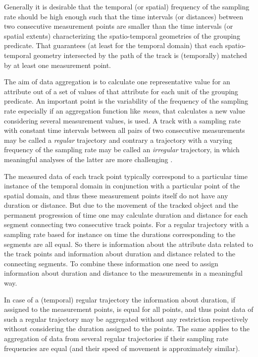 \documentclass[12pt, oneside, a4paper]{scrbook}
\begin{document}
Generally it is desirable that the temporal (or spatial) frequency of the sampling rate should be high enough such that the time intervals (or distances) between two consecutive measurement points are smaller than the time intervals (or spatial extents) characterizing the spatio-temporal geometries of the grouping predicate.
That guarantees (at least for the temporal domain) that each spatio-temporal geometry intersected by the path of the track is (temporally) matched by at least one measurement point.
\par\medskip
The aim of data aggregation is to calculate one representative value for an attribute out of a set of values of that attribute for each unit of the grouping predicate.
An important point is the variability of the frequency of the sampling rate especially if an aggregation function like \textit{mean}, that calculates a new value considering several measurement values, is used. 
A track with a sampling rate with constant time intervals between all pairs of two consecutive measurements may be called a \textit{regular} trajectory and contrary a trajectory with a varying frequency of the sampling rate may be called an \textit{irregular} trajectory, in which meaningful analyses of the latter are more challenging \citep{calenge_concept_2009}.
\par\medskip
The measured data of each track point typically correspond to a particular time instance of the temporal domain in conjunction with a particular point of the spatial domain, and thus these measurement points itself do not have any duration or distance. 
But due to the movement of the tracked object and the permanent progression of time one may calculate duration and distance for each segment connecting two consecutive track points. 
For a regular trajectory with a sampling rate based for instance on time the durations corresponding to the segments are all equal.
So there is information about the attribute data related to the track points and information about duration and distance related to the connecting segments.
To combine these information one need to assign information about duration and distance to the measurements in a meaningful way.
\par\medskip
In case of a (temporal) regular trajectory the information about duration, if assigned to the measurement points, is equal for all points, and thus point data of such a regular trajectory may be aggregated without any restriction respectively without considering the duration assigned to the points.
The same applies to the aggregation of data from several regular trajectories if their sampling rate frequencies are equal (and their speed of movement is approximately similar).
\end{document}
